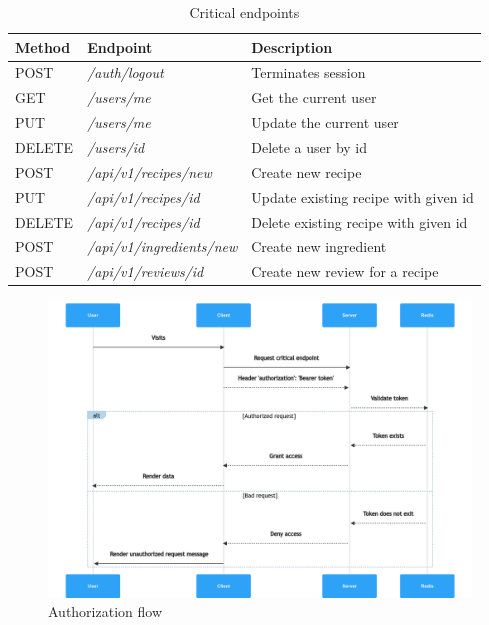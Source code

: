 \begin{table}
    \caption{Critical endpoints}
    \label{tab:critical-endpoints}
    \begin{tabulary}{1.0\textwidth}{|L|L|L|}
        \hline
        \textbf{Method} & \textbf{Endpoint} & \textbf{Description} \\
        \hline
        POST & \textit{/auth/logout} & Terminates session \\
        \hline
        GET & \textit{/users/me} & Get the current user \\
        \hline
        PUT & \textit{/users/me} & Update the current user \\
        \hline
        DELETE & \textit{/users/{id}} & Delete a user by id \\
        \hline
        POST & \textit{/api/v1/recipes/new} & Create new recipe \\
        \hline
        PUT & \textit{/api/v1/recipes/{id}} & Update existing recipe with given id \\
        \hline
        DELETE & \textit{/api/v1/recipes/{id}} & Delete existing recipe with given id \\
        \hline
        POST & \textit{/api/v1/ingredients/new} & Create new ingredient \\
        \hline
        POST & \textit{/api/v1/reviews/id} & Create new review for a recipe \\
        \hline
    \end{tabulary}
\end{table}


\begin{figure}
    \centering
    \includegraphics[width=\textwidth]{../../img/chapter-4/authorized.png}
    \caption{Authorization flow}
    \label{fig:authorization-flow}
\end{figure}


